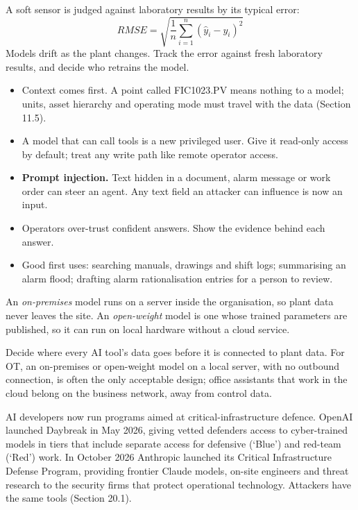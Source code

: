  A soft sensor is judged against laboratory results by its typical error:
\[ RMSE = \sqrt{\frac{1}{n}\sum_{i=1}^{n} (\hat{y}_i - y_i)^2} \]
Models drift as the plant changes. Track the error against fresh laboratory results, and decide who retrains the model.

\begin{itemize}
\item Context comes first. A point called FIC1023.PV means nothing to a model; units, asset hierarchy and operating mode must travel with the data (Section 11.5).
\item A model that can call tools is a new privileged user. Give it read-only access by default; treat any write path like remote operator access.
\item \textbf{Prompt injection.} Text hidden in a document, alarm message or work order can steer an agent. Any text field an attacker can influence is now an input.
\item Operators over-trust confident answers. Show the evidence behind each answer.
\item Good first uses: searching manuals, drawings and shift logs; summarising an alarm flood; drafting alarm rationalisation entries for a person to review.
\end{itemize}

 An \emph{on-premises} model runs on a server inside the organisation, so plant data never leaves the site. An \emph{open-weight} model is one whose trained parameters are published, so it can run on local hardware without a cloud service.

 Decide where every AI tool's data goes before it is connected to plant data. For OT, an on-premises or open-weight model on a local server, with no outbound connection, is often the only acceptable design; office assistants that work in the cloud belong on the business network, away from control data.

AI developers now run programs aimed at critical-infrastructure defence. OpenAI launched Daybreak in May 2026, giving vetted defenders access to cyber-trained models in tiers that include separate access for defensive (‘Blue’) and red-team (‘Red’) work. In October 2026 Anthropic launched its Critical Infrastructure Defense Program, providing frontier Claude models, on-site engineers and threat research to the security firms that protect operational technology. Attackers have the same tools (Section 20.1).

